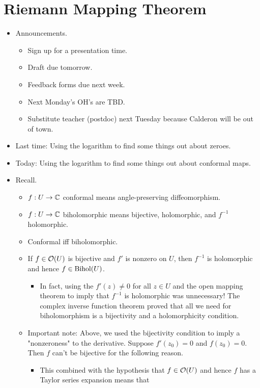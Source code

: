 \documentclass[../notes.tex]{subfiles}
\begin{document}
\section{Riemann Mapping Theorem}
\begin{itemize}
    \item {}Announcements.
    \begin{itemize}
        \item Sign up for a presentation time.
        \item Draft due tomorrow.
        \item Feedback forms due next week.
        \item Next Monday's OH's are TBD.
        \item Substitute teacher (postdoc) next Tuesday because Calderon will be out of town.
    \end{itemize}
    \item Last time: Using the logarithm to find some things out about zeroes.
    \item Today: Using the logarithm to find some things out about conformal maps.
    \item Recall.
    \begin{itemize}
        \item $f:U\to\mathbb{C}$ conformal means angle-preserving diffeomorphism.
        \item $f:U\to\mathbb{C}$ biholomorphic means bijective, holomorphic, and $f^{-1}$ holomorphic.
        \item Conformal iff biholomorphic.
        \item If $f\in\mathcal{O}(U)$ is bijective and $f'$ is nonzero on $U$, then $f^{-1}$ is holomorphic and hence $f\in\operatorname{Bihol}(U)$.
        \begin{itemize}
            \item In fact, using the $f'(z)\neq 0$ for all $z\in U$ and the open mapping theorem to imply that $f^{-1}$ is holomorphic was unnecessary! The complex inverse function theorem proved that all we need for biholomorphism is a bijectivity and a holomorphicity condition.
        \end{itemize}
        \item Important note: Above, we used the bijectivity condition to imply a "nonzeroness" to the derivative. Suppose $f'(z_0)=0$ and $f(z_0)=0$. Then $f$ can't be bijective for the following reason.
        \begin{itemize}
            \item This combined with the hypothesis that $f\in\mathcal{O}(U)$ and hence $f$ has a Taylor series expansion means that

\end{itemize}
\end{itemize}
\end{itemize}
\end{document}
